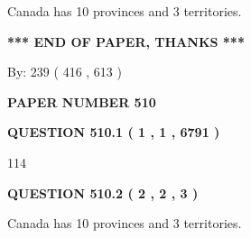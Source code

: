 \documentclass[12pt]{article}
\begin{document}
  
 
 
\noindent{}
 
 
Canada has 10  provinces and 3 territories.
 
 
 
 
   
   
 \vspace{0.2in}
 
   
   
   
   
\vspace{1.0in} 
{\textbf{\large{ *** END OF PAPER, THANKS *** }}} 
   
   
\hspace{1.0in} By: 
 239 ( 416 ,  613 )
   
   
   
   
\newpage 
\setcounter{page}{ 
   510001 } 
   
   
   
   
 {\textbf{ \Large{ PAPER NUMBER  510  }}}
   
   
\vspace{0.2in}
   
   
   
   
   
   
 \vspace{0.2in}
 
 
 
 
   
   
  
\vspace{0.2in}
  
{\textbf{\Large{QUESTION
510.1 
 ( 1 , 1 , 6791 )
}}}
  
  
 
 
\noindent{}

114
 
 
  
\vspace{0.2in}
  
{\textbf{\Large{QUESTION
510.2 
 ( 2 , 2 , 3 )
}}}
  
  
 
 
\noindent{}
 
 
Canada has 10  provinces and 3 territories.
 
\end{document}
